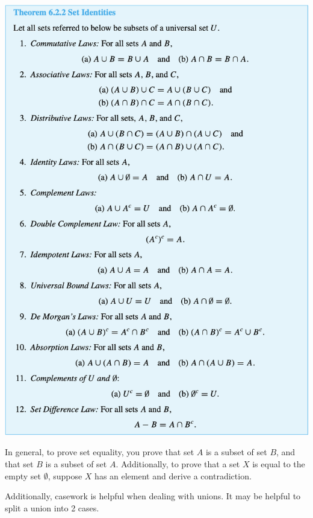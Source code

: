 \documentclass[a4paper]{report}
\begin{document}
\includegraphics[scale=0.65]{setids}

In general, to prove set equality, you prove that set $A$ is a subset of set $B$, and that
set $B$ is a subset of set $A$. Additionally, to prove that a set $X$ is equal to the empty set
$\emptyset$, suppose $X$ has an element and derive a contradiction.

Additionally, casework is helpful when dealing with unions. It may be helpful to split a union into
2 cases.
\end{document}
